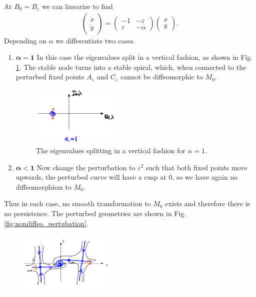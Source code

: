 \begin{ex}[]
	At $B_0 = B_{\varepsilon}$ we can linearize to find
	\begin{align}
		\begin{pmatrix}
			\dot{x} \\ \dot{y}
		\end{pmatrix}
		 = 
		 \begin{pmatrix}
			 -1 & - \varepsilon \\
			 \varepsilon & -\alpha 
		 \end{pmatrix}
		 \begin{pmatrix}
		 	x \\ y
		 \end{pmatrix}
		. 
	\end{align}
Depending on $\alpha $ we differentiate two cases.
\begin{enumerate}
	\item $\bm{\alpha =1} $ In this case the eigenvalues split in a vertical fashion, as shown in Fig. \ref{fig:eigv_vertical_split}. The stable node turns into a stable spiral, which, when connected to the perturbed fixed points $A_{\varepsilon}$ and $C_{\varepsilon}$ cannot be diffeomorphic to $M_0$.
		\begin{figure}[h!]
			\centering
			\includegraphics[width=0.4\textwidth]{figures/ch9/11_5vertical_split.png}
			\caption{The eigenvalues splitting in a vertical fashion for $\alpha=1$.}
			\label{fig:eigv_vertical_split}
		\end{figure}
	\item $\bm{\alpha<1}$ Now change the perturbation to $\varepsilon^{2}$ such that both fixed points move upwards, the perturbed curve will have a cusp at 0, so we have again no diffeomorphism to $M_0$.	
\end{enumerate}
Thus in each case, no smooth transformation to $M_0$ exists and therefore there is no persistence. The perturbed geometries are shown in Fig. \ref{fig:nondiffeo_pertubation}.
\begin{figure}[h!]
	\centering
	\includegraphics[width=0.4\textwidth]{figures/ch9/11_75alpha_one_perturb.png}

\end{figure}
\end{ex}
